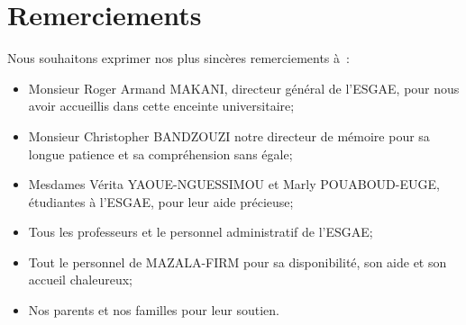 \chapter*{Remerciements}

Nous souhaitons exprimer nos plus sincères remerciements à :

\begin{itemize}
  \item Monsieur Roger Armand MAKANI, directeur général de l’ESGAE,
      pour nous avoir accueillis dans cette enceinte universitaire;

  \item Monsieur Christopher BANDZOUZI notre directeur de mémoire pour sa
      longue patience et sa compréhension sans égale;

  \item Mesdames Vérita YAOUE-NGUESSIMOU et Marly POUABOUD-EUGE, étudiantes à l’ESGAE, pour
      leur aide précieuse;

  \item Tous les professeurs et le personnel administratif de l’ESGAE;


  \item Tout le personnel de MAZALA-FIRM pour sa disponibilité, son aide et son
      accueil chaleureux;

  \item Nos parents et nos familles pour leur soutien.

\end{itemize}
